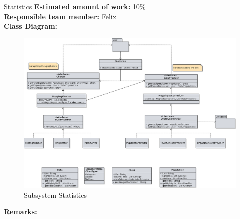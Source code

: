 \begin{subsection}{Statistics}
	\textbf{Estimated amount of work:} 10\% \\
	\textbf{Responsible team member:} Felix \\
	\textbf{Class Diagram:} \\
	
	\begin{figure}[!h]
	  \centering
		\includegraphics[width=1\textwidth]{../class_diagrams/statistics.png}
	  \caption{Subsystem Statistics}
	  \label{subsystem_question}
	\end{figure}
	
	\textbf{Remarks:} \\
	
\end{subsection}
